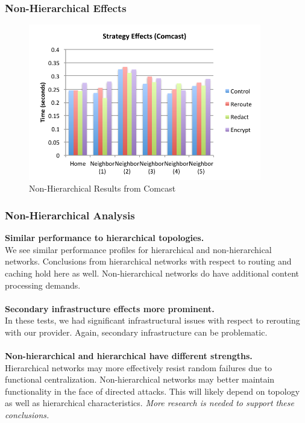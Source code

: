 \documentclass[t,handout]{beamer}
\begin{document}
\begin{frame}
\frametitle{Non-Hierarchical Effects}
\begin{figure}[!t]
\centering
\includegraphics[width=4in]{nh_strategy_effects_local}
\caption{Non-Hierarchical Results from Comcast}
\end{figure}
\end{frame}

\begin{frame}
\frametitle{Non-Hierarchical Analysis}
{\bf Similar performance to hierarchical topologies.} \\
{\scriptsize We see similar performance profiles for hierarchical and non-hierarchical networks.  Conclusions from hierarchical networks with respect to routing and caching hold here as well. Non-hierarchical networks do have additional content processing demands.} \\
~\\
{\bf Secondary infrastructure effects more prominent.} \\
{\scriptsize In these tests, we had significant infrastructural issues with respect to rerouting with our provider.  Again, secondary infrastructure can be problematic.  } \\
~\\
{\bf Non-hierarchical and hierarchical have different strengths.} \\
{\scriptsize Hierarchical networks may more effectively resist random failures due to functional centralization. Non-hierarchical networks may better maintain functionality in the face of directed attacks.  This will likely depend on topology as well as hierarchical characteristics.  \textit{More research is needed to support these conclusions.}} \\
~\\
\end{frame}
\end{document}
